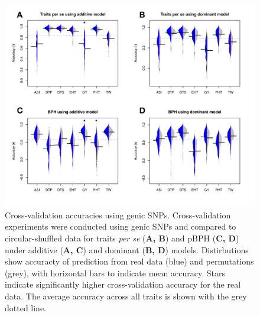 \documentclass[9pt,twocolumn,twoside]{gsajnl}
\begin{document}
\begin{figure}[htbp]
\centering
\includegraphics[width=\linewidth]{SFig_genicsnp_m.pdf}
\caption{Cross-validation accuracies using genic SNPs. Cross-validation experiments were conducted using genic SNPs and compared to circular-shuffled data for traits \emph{per se} (\textbf{A, B}) and pBPH (\textbf{C, D}) under additive (\textbf{A, C}) and dominant (\textbf{B, D}) models. Distirbutions show accuracty of prediction from real data (blue) and permutations (grey), with horizontal bars to indicate mean accuracy.  Stars indicate significantly higher cross-validation accuracy for the real data.  The average accuracy across all traits is shown with the grey dotted line. }
\label{fig:genicsnp}
\end{figure}
\end{document}
